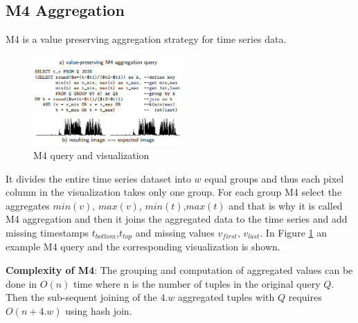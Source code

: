 \subsection{M4 Aggregation}
M4 is a value preserving aggregation strategy for time series data.
\begin{figure}[h]
	\includegraphics[width=0.5\textwidth]{m4}
	\caption{M4 query and visualization}   
	\label{fig:2}
\end{figure}
It divides the entire time series dataset into $w$ equal groups and thus each pixel column in the visualization takes only one group. For each group M4 select the aggregates $min(v)$,
$max(v)$, $min(t)$,$max(t)$ and that is why it is called M4 aggregation and then it joins the aggregated data to the time series and add missing timestamps $t_{bottom}$,$t_{top}$ and missing values $v_{first}$, $v_{last}$. In Figure \ref{fig:2} an example M4 query and 
the corresponding visualization is shown.

\textbf{Complexity of M4}: The grouping and computation of aggregated values can be done in $O(n)$ time where n is the number of tuples in the original query $Q$. Then the sub-sequent joining of the $4.w$ aggregated tuples with $Q$ requires $O(n+ 4.w)$ using hash join.
